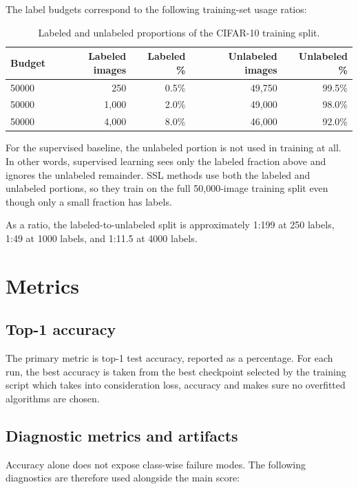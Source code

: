 The label budgets correspond to the following training-set usage ratios:

\begin{table}[htbp]
\centering
\small
\caption{Labeled and unlabeled proportions of the CIFAR-10 training split.}
\label{tab:budget_accounting}
\begin{tabular}{lrrrr}
\hline
Budget & Labeled images & Labeled \% & Unlabeled images & Unlabeled \% \\
\hline
50000 & 250 & 0.5\% & 49,750 & 99.5\% \\
50000 & 1,000 & 2.0\% & 49,000 & 98.0\% \\
50000 & 4,000 & 8.0\% & 46,000 & 92.0\% \\
\hline
\end{tabular}
\end{table}

For the supervised baseline, the unlabeled portion is not used in training at all. In other words, supervised learning sees only the labeled fraction above and ignores the unlabeled remainder. SSL methods use both the labeled and unlabeled portions, so they train on the full 50,000-image training split even though only a small fraction has labels.

As a ratio, the labeled-to-unlabeled split is approximately 1:199 at 250 labels, 1:49 at 1000 labels, and 1:11.5 at 4000 labels.

\section{Metrics}

\subsection{Top-1 accuracy}

The primary metric is top-1 test accuracy, reported as a percentage. For each run, the best accuracy is taken from the best checkpoint selected by the training script which takes into consideration loss, accuracy and makes sure no overfitted algorithms are chosen.


\subsection{Diagnostic metrics and artifacts}

Accuracy alone does not expose class-wise failure modes. The following diagnostics are therefore used alongside the main score:

